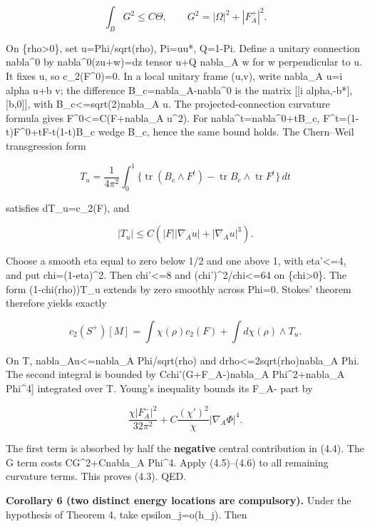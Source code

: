 \documentclass[
  10pt,
]{article}
\begin{document}
\[
 \int_B G^2\le C\Theta,\qquad G^2=|\Omega|^2+|F_A^+|^2. \tag{4.6}
\]

On \{rho\textgreater0\}, set u=Phi/sqrt(rho), Pi=uu*, Q=1-Pi. Define a
unitary connection nabla\^{}0 by nabla\^{}0(zu+w)=dz tensor u+Q nabla\_A
w for w perpendicular to u. It fixes u, so c\_2(F\^{}0)=0. In a local
unitary frame (u,v), write nabla\_A u=i alpha u+b v; the difference
B\_c=nabla\_A-nabla\^{}0 is the matrix {[}{[}i
alpha,-b*{]},{[}b,0{]}{]}, with
\textbar B\_c\textbar\textless=sqrt(2)\textbar nabla\_A u\textbar. The
projected-connection curvature formula gives
\textbar F\^{}0\textbar\textless=C(\textbar F\textbar+\textbar nabla\_A
u\textbar\^{}2). For nabla\^{}t=nabla\^{}0+tB\_c,
F\^{}t=(1-t)F\^{}0+tF-t(1-t)B\_c wedge B\_c, hence the same bound holds.
The Chern--Weil transgression form

\[
 T_u=\frac1{4\pi^2}\int_0^1
       \{\operatorname{tr}(B_c\wedge F^t)
             -\operatorname{tr}B_c\wedge\operatorname{tr}F^t\}\,dt
\]

satisfies dT\_u=c\_2(F), and

\[
 |T_u|\le C\left(|F||\nabla_Au|+|\nabla_Au|^3\right).  \tag{4.7}
\]

Choose a smooth eta equal to zero below 1/2 and one above 1, with
\textbar eta'\textbar\textless=4, and put chi=(1-eta)\^{}2. Then
\textbar chi'\textbar\textless=8 and (chi')\^{}2/chi\textless=64 on
\{chi\textgreater0\}. The form (1-chi(rho))T\_u extends by zero smoothly
across Phi=0. Stokes' theorem therefore yields exactly

\[
 c_2(S^+)[M]=\int\chi(\rho)c_2(F)+\int d\chi(\rho)\wedge T_u.
                                                        \tag{4.8}
\]

On T, \textbar nabla\_Au\textbar\textless=\textbar nabla\_A
Phi\textbar/sqrt(rho) and
\textbar drho\textbar\textless=2sqrt(rho)\textbar nabla\_A Phi\textbar.
The second integral is bounded by
C\textbar chi'\textbar{[}(G+\textbar F\_A-\textbar)\textbar nabla\_A
Phi\textbar\^{}2+\textbar nabla\_A Phi\textbar\^{}4{]} integrated over
T. Young's inequality bounds its F\_A- part by

\[
 \frac{\chi|F_A^-|^2}{32\pi^2}
       +C\frac{(\chi')^2}{\chi}|\nabla_A\Phi|^4.
\]

The first term is absorbed by half the \textbf{negative} central
contribution in (4.4). The G term costs CG\^{}2+C\textbar nabla\_A
Phi\textbar\^{}4. Apply (4.5)--(4.6) to all remaining curvature terms.
This proves (4.3). QED.

\textbf{Corollary 6 (two distinct energy locations are compulsory).}
Under the hypothesis of Theorem 4, take epsilon\_j=o(h\_j). Then
\end{document}
